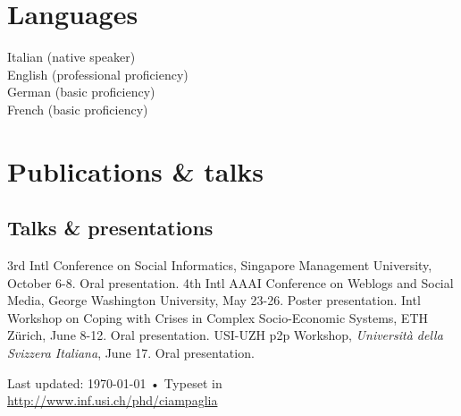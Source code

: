 \documentclass[10pt, letterpaper]{article}
\newcommand{\years}[1]{\marginnote{\small #1}}
\begin{document}
\section*{Languages}

Italian (native speaker)\\
%
English (professional proficiency)\\
%
German (basic proficiency)\\
%
French (basic proficiency)

\section*{Publications \& talks}

\printbibliography[heading=subbibliography,title=Journal papers, type=article]
%
\printbibliography[heading=subbibliography,title=Conference proceedings,
type=inproceedings]
%
\printbibliography[heading=subbibliography,title=Theses \& miscellanea,
nottype=article, nottype=inproceedings]

\subsection*{Talks \& presentations}

\years{2012} 3rd Intl Conference on Social Informatics, Singapore Management
University, October 6-8. Oral presentation.
%
\years{2010} 4th Intl AAAI Conference on Weblogs and Social Media, George
Washington University, May 23-26. Poster presentation.
%
\years{2009} Intl Workshop on Coping with Crises in Complex Socio-Economic
Systems, ETH Z\"urich, June 8-12. Oral presentation.
%
\years{2009} USI-UZH p2p Workshop, \textsl{Università della Svizzera Italiana},
June 17. Oral presentation.

\vfill{}

\begin{center}
{\scriptsize  Last updated: \today\- •\- 
Typeset in { \XeTeX}\\
\href{http://www.inf.usi.ch/phd/ciampaglia}{http://www.inf.usi.ch/phd/ciampaglia}}
\end{center}
\end{document}
